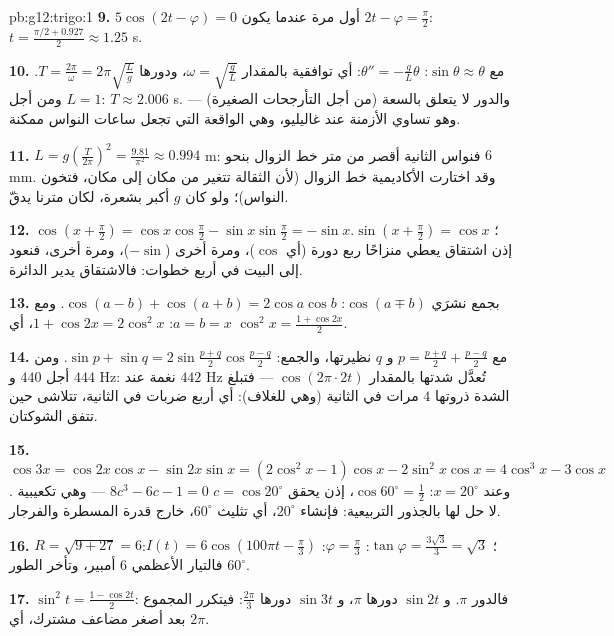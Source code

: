 \begin{solution}{pb:g12:trigo:1}
\textbf{9.} $5\cos(2t - \varphi) = 0$ أول مرة عندما يكون
$2t - \varphi = \frac\pi2$:
$t = \frac{\pi/2 + 0.927}{2} \approx 1.25$ s.

\textbf{10.} مع $\sin\theta \approx \theta$:
$\theta'' = -\frac gL \theta$: أي توافقية بالمقدار
$\omega = \sqrt{\frac gL}$، ودورها
$T = \frac{2\pi}{\omega} = 2\pi\sqrt{\frac Lg}$. ومن أجل
$L = 1$: $T \approx 2.006$ s. والدور لا يتعلق
بالسعة (من أجل التأرجحات الصغيرة) --- وهو تساوي الأزمنة عند غاليليو،
وهي الواقعة التي تجعل ساعات النواس ممكنة.

\textbf{11.} $L = g\left(\frac{T}{2\pi}\right)^2 =
\frac{9.81}{\pi^2} \approx 0.994$ m: فنواس الثانية
أقصر من متر خط الزوال بنحو $6$ mm. وقد اختارت الأكاديمية
خط الزوال (لأن الثقالة تتغير من مكان إلى مكان، فتخون
النواس)؛ ولو كان $g$ أكبر بشعرة، لكان مترنا
يدقّ.

\textbf{12.} $\cos\left(x + \frac\pi2\right) =
\cos x \cos\frac\pi2 - \sin x \sin\frac\pi2 = -\sin x$؛
$\sin\left(x + \frac\pi2\right) = \cos x$. إذن اشتقاق
 يعطي  منزاحًا ربع دورة (أي $\cos$)، ومرة أخرى
($-\sin$)، ومرة أخرى، فنعود إلى البيت في أربع خطوات:
فالاشتقاق يدير الدائرة.

\textbf{13.} بجمع نشرَي $\cos(a \mp b)$:
$\cos(a-b) + \cos(a+b) = 2\cos a\cos b$. ومع $a = b = x$:
$1 + \cos 2x = 2\cos^2 x$، أي
$\cos^2 x = \frac{1 + \cos 2x}{2}$.

\textbf{14.} مع $p = \frac{p+q}{2} + \frac{p-q}{2}$ و
$q$ نظيرتها،  والجمع:
$\sin p + \sin q = 2\sin\frac{p+q}{2}\cos\frac{p-q}{2}$. ومن أجل
$440$ و $444$ Hz: نغمة عند $442$ Hz تُعدَّل شدتها
بالمقدار $\cos(2\pi \cdot 2t)$ --- فتبلغ الشدة ذروتها $4$
مرات في الثانية (وهي  للغلاف): أي أربع ضربات
في الثانية، تتلاشى حين تتفق الشوكتان.

\textbf{15.} $\cos 3x = \cos 2x\cos x - \sin 2x \sin x =
(2\cos^2 x - 1)\cos x - 2\sin^2 x\cos x = 4\cos^3 x -
3\cos x$. وعند $x = 20^\circ$: $\cos 60^\circ = \frac12$، إذن
يحقق $c = \cos 20^\circ$  $8c^3 - 6c - 1 = 0$ --- وهي تكعيبية
لا حل لها بالجذور التربيعية: فإنشاء $20^\circ$، أي
تثليث $60^\circ$، خارج قدرة المسطرة والفرجار.

\textbf{16.} $R = \sqrt{9 + 27} = 6$؛
$\tan\varphi = \frac{3\sqrt3}{3} = \sqrt3$:
$\varphi = \frac\pi3$: $I(t) = 6\cos\left(100\pi t -
\frac\pi3\right)$: فالتيار الأعظمي $6$ أمبير، وتأخر الطور $60^\circ$.

\textbf{17.} $\sin^2 t = \frac{1 - \cos 2t}{2}$: فالدور
$\pi$. و $\sin 2t$ دورها $\pi$، و $\sin 3t$ دورها
$\frac{2\pi}{3}$: فيتكرر المجموع بعد أصغر مضاعف
مشترك، أي $2\pi$.


\end{solution}
